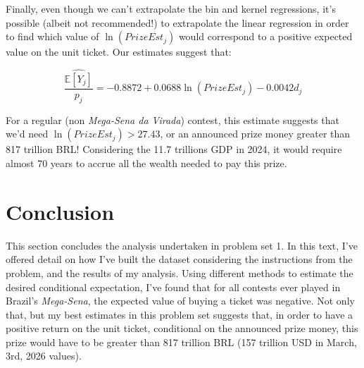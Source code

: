 \documentclass{article}
\begin{document}
Finally, even though we can't extrapolate the bin and kernel regressions, it's possible (albeit not recommended!) to extrapolate the linear regression in order to find which value of $\ln(PrizeEst_j)$ would correspond to a positive expected value on the unit ticket. Our estimates suggest that:

$$
\hat{\frac{\mathbb{E}[Y_j]}{p_j}}=-0.8872+0.0688\ln(PrizeEst_j)-0.0042d_j
$$

For a regular (non \textit{Mega-Sena da Virada}) contest, this estimate suggests that we'd need $\ln(PrizeEst_j)>27.43$, or an announced prize money greater than 817 trillion BRL! Considering the 11.7 trillions GDP in 2024, it would require almost 70 years to accrue all the wealth needed to pay this prize. 

\section{Conclusion}
\label{sec:4}

This section concludes the analysis undertaken in problem set 1. In this text, I've offered detail on how I've built the dataset considering the instructions from the problem, and the results of my analysis. Using different methods to estimate the desired conditional expectation, I've found that for all contests ever played in Brazil's \textit{Mega-Sena}, the expected value of buying a ticket was negative. Not only that, but my best estimates in this problem set suggests that, in order to have a positive return on the unit ticket, conditional on the announced prize money, this prize would have to be greater than 817 trillion BRL (157 trillion USD in March, 3rd, 2026 values).
\end{document}
